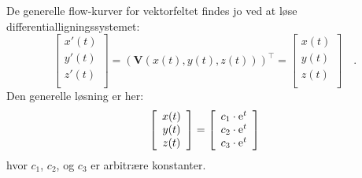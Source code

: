 De generelle flow-kurver for vektorfeltet findes jo ved at løse differentialligningssystemet:
\begin{equation}
\left[
  \begin{array}{c}
    x'(t) \\
    y'(t) \\
    z'(t) \\
  \end{array}
\right] = (\mathbf{V}(x(t), y(t), z(t)))^{\top} = \left[
                                                    \begin{array}{c}
                                                     x(t) \\
                                                      y(t) \\
                                                      z(t) \\
                                                    \end{array}
                                                  \right] \quad .
\end{equation}
Den generelle løsning er her:
\begin{equation}
\left[
  \begin{array}{c}
    x(t) \\
    y(t) \\
    z(t) \\
  \end{array}
\right]
  = \left[
  \begin{array}{c}
    c_{1} \cdot \mathrm{e}^{t} \\
    c_{2} \cdot \mathrm{e}^{t} \\
     c_{3}\cdot \mathrm{e}^{t} \\
  \end{array}
\right]
\end{equation}
hvor $c_{1}$, $c_{2}$, og $c_{3}$ er arbitrære konstanter.\\


